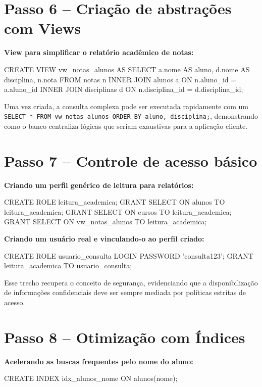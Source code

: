 \section{Passo 6 -- Criação de abstrações com Views}

\textbf{View para simplificar o relatório acadêmico de notas:}
\begin{sqlcode}
CREATE VIEW vw_notas_alunos AS
SELECT
    a.nome AS aluno,
    d.nome AS disciplina,
    n.nota
FROM notas n
INNER JOIN alunos a
    ON n.aluno_id = a.aluno_id
INNER JOIN disciplinas d
    ON n.disciplina_id = d.disciplina_id;
\end{sqlcode}

Uma vez criada, a consulta complexa pode ser executada rapidamente com um \texttt{SELECT * FROM vw\_notas\_alunos ORDER BY aluno, disciplina;}, demonstrando como o banco centraliza lógicas que seriam exaustivas para a aplicação cliente.

\section{Passo 7 -- Controle de acesso básico}

\textbf{Criando um perfil genérico de leitura para relatórios:}
\begin{sqlcode}
CREATE ROLE leitura_academica;
GRANT SELECT ON alunos TO leitura_academica;
GRANT SELECT ON cursos TO leitura_academica;
GRANT SELECT ON vw_notas_alunos TO leitura_academica;
\end{sqlcode}

\textbf{Criando um usuário real e vinculando-o ao perfil criado:}
\begin{sqlcode}
CREATE ROLE usuario_consulta LOGIN PASSWORD 'consulta123';
GRANT leitura_academica TO usuario_consulta;
\end{sqlcode}

Esse trecho recupera o conceito de segurança, evidenciando que a disponibilização de informações confidenciais deve ser sempre mediada por políticas estritas de acesso.

\section{Passo 8 -- Otimização com Índices}

\textbf{Acelerando as buscas frequentes pelo nome do aluno:}
\begin{sqlcode}
CREATE INDEX idx_alunos_nome
ON alunos(nome);
\end{sqlcode}

